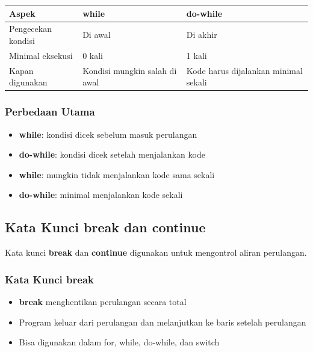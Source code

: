 \begin{center}
\begin{tabular}{|l|l|l|}
\hline
\textbf{Aspek} & \textbf{while} & \textbf{do-while} \\
\hline
Pengecekan kondisi & Di awal & Di akhir \\
\hline
Minimal eksekusi & 0 kali & 1 kali \\
\hline
Kapan digunakan & Kondisi mungkin salah di awal & Kode harus dijalankan minimal sekali \\
\hline
\end{tabular}
\end{center}

\subsubsection{Perbedaan Utama}

\begin{itemize}
\item \textbf{while}: kondisi dicek sebelum masuk perulangan
\item \textbf{do-while}: kondisi dicek setelah menjalankan kode
\item \textbf{while}: mungkin tidak menjalankan kode sama sekali
\item \textbf{do-while}: minimal menjalankan kode sekali
\end{itemize}

\subsection{Kata Kunci break dan continue}\label{kata-kunci-continue-dan-break}

Kata kunci \textbf{break} dan \textbf{continue} digunakan untuk mengontrol aliran perulangan.

\subsubsection{Kata Kunci break}

\begin{itemize}
\item \textbf{break} menghentikan perulangan secara total
\item Program keluar dari perulangan dan melanjutkan ke baris setelah perulangan
\item Bisa digunakan dalam for, while, do-while, dan switch
\end{itemize}

